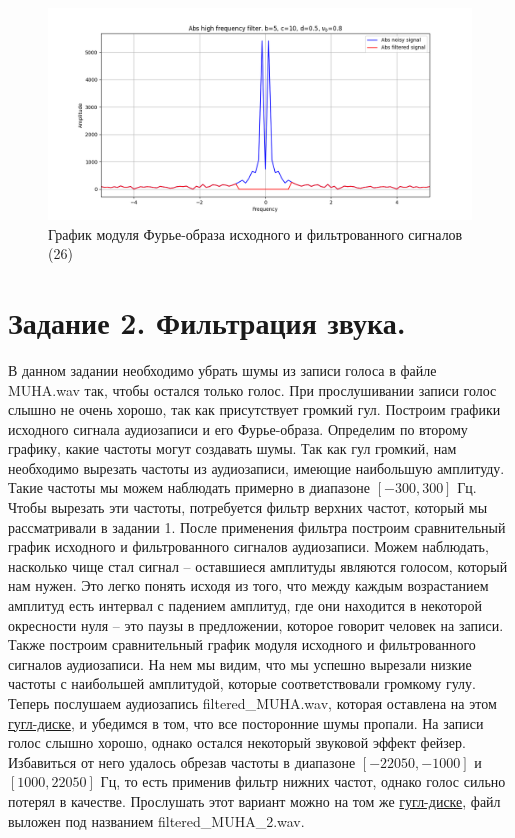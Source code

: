 \documentclass[a4paper, 12pt]{article}
\begin{document}
    \begin{figure}[!htb]
        \centering
        \includegraphics[scale=0.48]{26_abs_u_U_nolow.png}
        \captionsetup{skip=0pt}
        \caption{График модуля Фурье-образа исходного и фильтрованного сигналов (26)}
        \label{fig:fig_56456}
    \end{figure}
    \newpage


    \section{Задание 2. Фильтрация звука.}
    В данном задании необходимо убрать шумы из записи голоса в файле MUHA.wav так, чтобы остался только голос. 
    При прослушивании записи голос слышно не очень хорошо, так как присутствует громкий гул. Построим графики
    исходного сигнала аудиозаписи и его Фурье-образа. Определим по второму графику, какие частоты могут создавать
    шумы. Так как гул громкий, нам необходимо вырезать частоты из аудиозаписи, имеющие наибольшую амплитуду. Такие частоты мы можем
    наблюдать примерно в диапазоне $[-300,300]$ Гц. Чтобы вырезать эти частоты, потребуется фильтр верхних частот, который
    мы рассматривали в задании 1. После применения фильтра построим сравнительный график исходного и фильтрованного
    сигналов аудиозаписи. Можем наблюдать, насколько чище стал сигнал -- оставшиеся амплитуды являются голосом, который 
    нам нужен. Это легко понять исходя из того, что между каждым возрастанием амплитуд есть интервал с падением амплитуд, 
    где они находится в некоторой окресности нуля -- это паузы в предложении, которое говорит человек на записи. Также построим
    сравнительный график модуля исходного и фильтрованного сигналов аудиозаписи. На нем мы видим, что мы успешно вырезали
    низкие частоты с наибольшей амплитудой, которые соответствовали громкому гулу. Теперь послушаем аудиозапись filtered\_{MUHA}.wav, которая 
    оставлена на этом \href{https://drive.google.com/drive/folders/1AuXIiKRWvXFOtJqV3uqPzC494zZ7vCrd?usp=sharing}{гугл-диске}, 
    и убедимся в том, что все посторонние шумы пропали. На записи голос слышно хорошо, однако остался некоторый звуковой эффект 
    фейзер. Избавиться от него удалось обрезав частоты в диапазоне $[-22050, -1000]$ и $[1000, 22050]$ Гц, то есть применив фильтр нижних частот,
    однако голос сильно потерял в качестве. Прослушать этот вариант можно на том же
    \href{https://drive.google.com/drive/folders/1AuXIiKRWvXFOtJqV3uqPzC494zZ7vCrd?usp=sharing}{гугл-диске},
    файл выложен под названием filtered\_{MUHA}\_{2}.wav.
\end{document}
